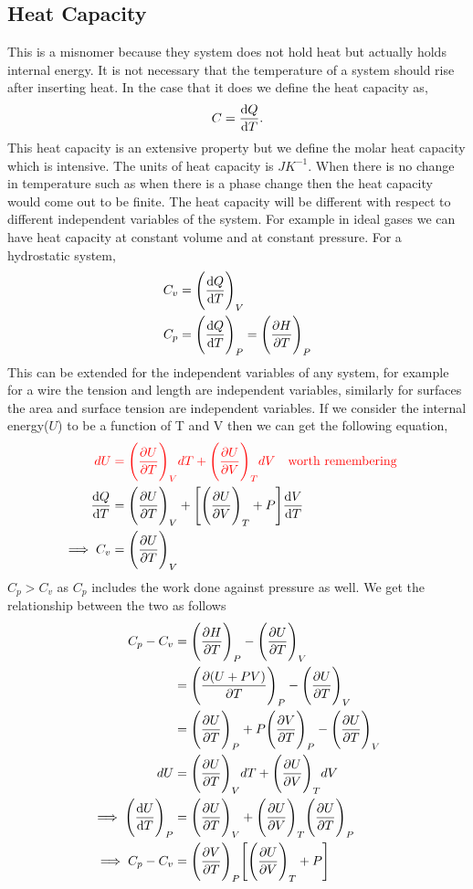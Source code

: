 \documentclass[12pt]{article}
\begin{document}
\subsection{Heat Capacity}
This is a misnomer because they system does not hold heat but actually holds internal energy. It is not necessary that the temperature of a system should rise after inserting heat. In the case that it does we define the heat capacity as,
\begin{equation}
	C=\dv{Q}{T}.
\end{equation}
This heat capacity is an extensive property but we define the molar heat capacity which is intensive. The units of heat capacity is $JK^{-1}$. When there is no change in temperature such as when there is a phase change then the heat capacity would come out to be finite. The heat capacity will be different with respect to different independent variables of the system. For example in ideal gases we can have heat capacity at constant volume and at constant pressure.
For a hydrostatic system,
\begin{align}
	C_v&=\Bigg(\dv{Q}{T}\Bigg)_V \\
	C_p&=\Bigg(\dv{Q}{T}\Bigg)_P=\Bigg(\pdv{H}{T}\Bigg)_P
\end{align}
This can be extended for the independent variables of any system, for example for a wire the tension and length are independent variables, similarly for surfaces the area and surface tension are independent variables. If we consider the internal energy($U$) to be a function of T and V then we can get the following equation,
\begin{align}
	    \color{red}{dU}&\color{red}={\Bigg(\pdv{U}{T}\Bigg)_VdT+\Bigg(\pdv{U}{V}\Bigg)_TdV} \qq{worth remembering}\\
	          \dv{Q}{T}&=\Bigg(\pdv{U}{T}\Bigg)_V+\Bigg[\Bigg(\pdv{U}{V}\Bigg)_T+P\Bigg]\dv{V}{T}\\
\implies	        C_v&=\Bigg(\pdv{U}{T}\Bigg)_V
\end{align}
$C_p>C_v$ as $C_p$ includes the work done against pressure as well. We get the relationship between
the two as follows
\begin{align*}
                        C_p-C_v&=\Bigg(\pdv{H}{T}\Bigg)_P-\Bigg(\pdv{U}{T}\Bigg)_V\\
                               &=\Bigg(\pdv{(U+PV)}{T}\Bigg)_P-\Bigg(\pdv{U}{T}\Bigg)_V\\
                               &=\Bigg(\pdv{U}{T}\Bigg)_P+P\Bigg(\pdv{V}{T}\Bigg)_P-\Bigg(\pdv{U}{T}\Bigg)_V\\                        
                             dU&=\Bigg(\pdv{U}{T}\Bigg)_VdT+\Bigg(\pdv{U}{V}\Bigg)_TdV \\
\implies\Bigg(\dv{U}{T}\Bigg)_P&=\Bigg(\pdv{U}{T}\Bigg)_V+\Bigg(\pdv{U}{V}\Bigg)_T\Bigg(\pdv{U}{T}\Bigg)_P\\
\implies                C_p-C_v&=\Bigg(\pdv{V}{T}\Bigg)_P\Bigg[\Bigg(\pdv{U}{V}\Bigg)_T+P\Bigg]
\end{align*}
\end{document}
